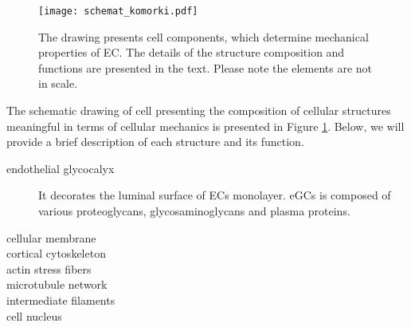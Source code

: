 \begin{figure}[tb]%
\centering
\texttt{[image: schemat\_komorki.pdf]}
\caption[Scheme presenting cellular structures determining mechanical properties of \gls{EC}.]{The drawing presents cell components, which determine mechanical properties of \gls{EC}. The details of the structure composition and functions are presented in the text. Please note the elements are not in scale.}
\label{fig:intro:cell_structure}
\end{figure}
The schematic drawing of cell presenting the composition of cellular structures meaningful in terms of cellular mechanics is presented in Figure \ref{fig:intro:cell_structure}. Below, we will provide a brief description of each structure and its function.
\begin{description}
\item[endothelial glycocalyx] It decorates the luminal surface of \glspl{EC} monolayer. \glspl{eGC} is composed of various proteoglycans, glycosaminoglycans and plasma proteins.
\item[cellular membrane]
\item[cortical cytoskeleton]
\item[actin stress fibers]
\item[microtubule network]
\item[intermediate filaments]
\item[cell nucleus]
\end{description}